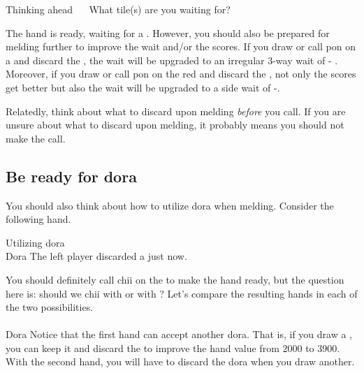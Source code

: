 \begin{itembox}[r]{Thinking ahead}
\bp
{}~~\bai\bai\rbai
\ep
\vspace{-10pt}
What tile(s) are you waiting for?
\end{itembox}
The hand is ready, waiting for a {\large{}}. However, you should also be prepared for melding further to improve the wait and/or the scores. 
If you draw or call {\jap pon} on a {\large{}} and discard the {\large{}}, the wait will be upgraded to an irregular 3-way wait of {\large{}- }. Moreover, if you draw or call {\jap pon} on the red {\large\rfw} and discard the {\large{}}, not only the scores get better but also the wait will be upgraded to a side wait of {\large{}-}.

\bigskip
Relatedly, think about what to discard upon melding \emph{before} you call. 
If you are unsure about what to discard upon melding, it probably means you should not make the call. 

\subsection{Be ready for {\jap dora}}
You should also think about how to utilize {\jap dora} when melding. Consider the following hand. 

\begin{itembox}[r]{Utilizing {\jap dora}}
\bp
{}~\fa\rfa\fa~~\\
\hspace{310pt}\footnotesize{\jap Dora}
\ep
\vspace{-20pt}
The left player discarded a {\large{}} just now.
\end{itembox}
\noindent You should definitely call {\jap chii} on the {\large{}} to make the hand ready, but the question here is: should we {\jap chii} with {\large{}} or with {\large{}}? Let's compare the resulting hands in each of the two possibilities. 
\bp
{}~~\fa\rfa\fa~\\
~~\fa\rfa\fa~\\
\hspace{320pt}\footnotesize{\jap Dora}
\ep
Notice that the first hand can accept another {\jap dora}. That is, if you draw a {\large{}}, you can keep it and discard the {\large{}} to improve the hand value from 2000 to 3900.
With the second hand, you will have to discard the {\jap dora} when you draw another. 

